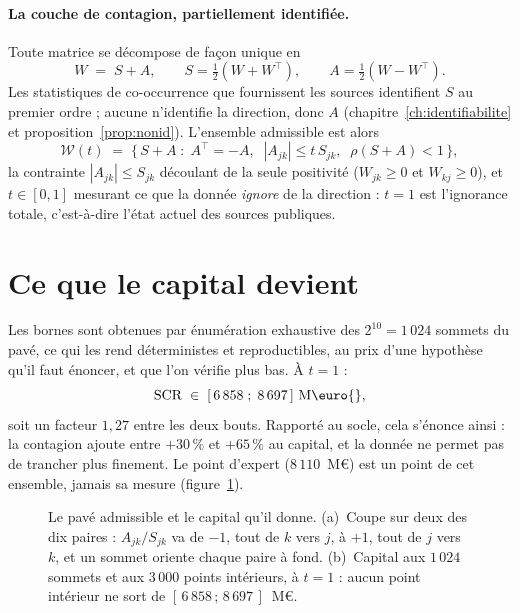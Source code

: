 \paragraph{La couche de contagion, partiellement identifiée.} Toute matrice se décompose
de façon unique en
\[
  W \;=\; S + A, \qquad S = \tfrac{1}{2}(W + W^{\top}), \qquad A = \tfrac{1}{2}(W - W^{\top}) .
\]
Les statistiques de co-occurrence que fournissent les sources identifient $S$ au premier ordre ;
aucune n'identifie la direction, donc $A$ (chapitre~\ref{ch:identifiabilite} et
proposition~\ref{prop:nonid}). L'ensemble admissible est alors
\[
  \mathcal{W}(t) \;=\; \bigl\{\, S + A \;:\; A^{\top} = -A, \;\; |A_{jk}| \leq t\,S_{jk},
  \;\; \rho(S+A) < 1 \,\bigr\},
\]
la contrainte $|A_{jk}| \leq S_{jk}$ découlant de la seule positivité ($W_{jk}\geq 0$ et
$W_{kj}\geq 0$), et $t\in[0,1]$ mesurant ce que la donnée \emph{ignore} de la direction :
$t=1$ est l'ignorance totale, c'est-à-dire l'état actuel des sources publiques.


\section{Ce que le capital devient}

Les bornes sont obtenues par énumération exhaustive des $2^{10} = 1\,024$ sommets
du pavé, ce qui les rend déterministes et reproductibles, au prix d'une hypothèse qu'il faut
énoncer, et que l'on vérifie plus bas. À $t=1$ :
\[
  \mathrm{SCR} \;\in\; [\,6\,858 \;;\; 8\,697\,]~\text{M\euro{}} ,
\]
soit un facteur $1{,}27$ entre les deux bouts. Rapporté au socle, cela s'énonce ainsi :
la contagion ajoute entre $+30\,\%$ et $+65\,\%$ au capital, et la donnée ne
permet pas de trancher plus finement. Le point d'expert ($8\,110$~M\euro{}) est un point
de cet ensemble, jamais sa mesure (figure~\ref{fig:pave-sommets}).

\begin{figure}[H]
  \centering
  \caption{Le pavé admissible et le capital qu'il donne. (a)~Coupe sur deux des dix paires :
$A_{jk}/S_{jk}$ va de $-1$, tout de $k$ vers $j$, à $+1$, tout de $j$ vers $k$, et un sommet
oriente chaque paire à fond. (b)~Capital aux $1\,024$ sommets et aux $3\,000$ points intérieurs,
à $t = 1$ : aucun point intérieur ne sort de $[\,6\,858\,;\,8\,697\,]$~M\euro{}.}
  \label{fig:pave-sommets}
\end{figure}

